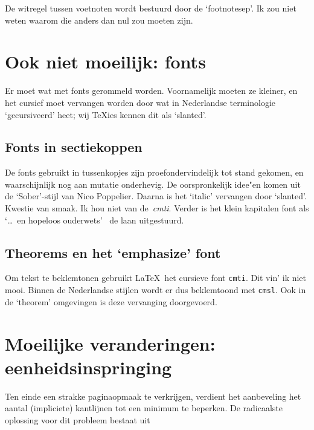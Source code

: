 \documentclass[oldtoc,a4paper,10pt]{rapport3}
\begin{document}
De witregel tussen voetnoten wordt bestuurd door de `footnotesep'. Ik
zou niet weten waarom die anders dan nul zou moeten zijn.
 
 
\section{Ook niet moeilijk: fonts}
 
Er moet wat met fonts gerommeld worden. Voornamelijk moeten ze
kleiner, en het cursief moet vervangen worden door wat in Nederlandse
terminologie `gecursiveerd' heet; wij \TeX ies kennen dit als
`slanted'.
 
\subsection{Fonts in sectiekoppen}
 
De fonts gebruikt in tussenkopjes zijn proefondervindelijk tot stand
gekomen, en waarschijnlijk nog aan mutatie onderhevig. De
oorspronkelijk idee"en komen uit de `Sober'-stijl van Nico Poppelier.
Daarna is het `italic' vervangen door `slanted'. Kwestie van smaak.
Ik hou niet van de~\mbox{\emph{cmti}}.  Verder is het klein kapitalen
font als `\dots~en hopeloos ouderwets'~\cite{Inge} de laan
uitgestuurd.
 
\subsection{Theorems en het `emphasize' font}
 
Om tekst te beklemtonen gebruikt \LaTeX\ het cursieve font
\texttt{cmti}.  Dit vin' ik niet mooi. Binnen de Nederlandse stijlen
wordt er dus beklemtoond met \texttt{cmsl}.  Ook in de `theorem'
omgevingen is deze vervanging doorgevoerd.
 
 
\section{Moeilijke veranderingen: eenheidsinspringing}
 
Ten einde een strakke paginaopmaak te verkrijgen, verdient het
aanbeveling het aantal (impliciete) kantlijnen tot een minimum te
beperken.  De radicaalste oplossing voor dit probleem bestaat uit
 
\end{document}
